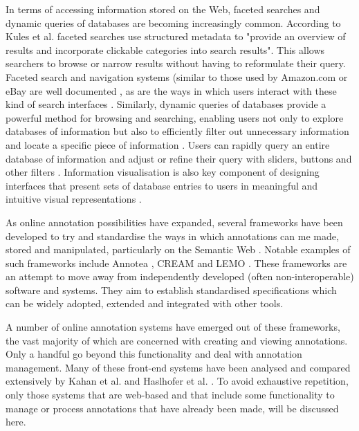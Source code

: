 In terms of accessing information stored on the Web, faceted searches and dynamic queries of databases are becoming increasingly common. According to Kules et al. \citep[p. 1]{Kules} faceted searches use structured metadata to "provide an overview of results and incorporate clickable categories into search results". This allows searchers to browse or narrow results without having to reformulate their query. Faceted search and navigation systems (similar to those used by Amazon.com \citep{Amazon} or eBay \citep{eBay} are well documented \citep{Hearst} \citep{Yitzhak}, as are the ways in which users interact with these kind of search interfaces \citep{Kules}. Similarly, dynamic queries of databases provide a powerful method for browsing and searching, enabling users not only to explore databases of information but also to efficiently filter out unnecessary information and locate a specific piece of information \cite[p. 1]{ShneidermanDynamic} \citep{PlaisantQueryPreview}. Users can rapidly query an entire database of information and adjust or refine their query with sliders, buttons and other filters \cite[p. 1]{ShneidermanDynamic}. Information visualisation is also key component of designing interfaces that present sets of database entries to users in meaningful and intuitive visual representations \citep{Card}. 

As online annotation possibilities have expanded, several frameworks have been developed to try and standardise the ways in which annotations can me made, stored and manipulated, particularly on the Semantic Web \citep{Berners-Lee} \citep{Uren}. Notable examples of such frameworks include Annotea \citep{kahan2002annotea}, CREAM \citep{handschuh2002authoring} and LEMO \citep{LEMO}. These frameworks are an attempt to move away from independently developed (often non-interoperable) software and systems. They aim to establish standardised specifications which can be widely adopted, extended and integrated with other tools. 

A number of online annotation systems have emerged out of these frameworks, the vast majority of which are concerned with creating and viewing annotations. Only a handful go beyond this functionality and deal with annotation management. Many of these front-end systems have been analysed and compared extensively by Kahan et al. \citep{kahan2002annotea} and Haslhofer et al. \citep{LEMO}. To avoid exhaustive repetition, only those systems that are web-based and that include some functionality to manage or process annotations that have already been made, will be discussed here.

